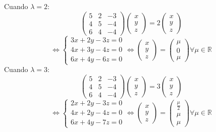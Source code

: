 \documentclass{article}
\begin{document}
Cuando $\lambda = 2$:
$$
\left( \begin{array}{ccc}
    5 & 2 & -3\\
    4 & 5 & -4\\
    6 & 4 & -4
\end{array} \right)
\left( \begin{array}{c}
      x \\
      y \\
      z
\end{array} \right) = 2
\left( \begin{array}{c}
      x \\
      y \\
      z
\end{array} \right)
$$
$$
\Leftrightarrow \left\{ \begin{array}{c}
     3x+2y-3z =0  \\
     4x+3y-4z =0  \\
     6x+4y-6z =0
\end{array} \right.
\Leftrightarrow \left( \begin{array}{c}
      x \\
      y \\
      z
\end{array} \right) =
\left( \begin{array}{c}
      \mu \\
      0 \\
      \mu
\end{array} \right) \forall \mu \in \mathbb{R}
$$
Cuando $\lambda = 3$:
$$
\left( \begin{array}{ccc}
    5 & 2 & -3\\
    4 & 5 & -4\\
    6 & 4 & -4
\end{array} \right)
\left( \begin{array}{c}
      x \\
      y \\
      z
\end{array} \right) = 3
\left( \begin{array}{c}
      x \\
      y \\
      z
\end{array} \right)
$$
$$
\Leftrightarrow \left\{ \begin{array}{c}
     2x+2y-3z =0  \\
     4x+2y-4z =0  \\
     6x+4y-7z =0
\end{array} \right.
\Leftrightarrow \left( \begin{array}{c}
      x \\
      y \\
      z
\end{array} \right) =
\left( \begin{array}{c}
      \frac{\mu}{2} \\
      \mu \\
      \mu
\end{array} \right) \forall \mu \in \mathbb{R}
$$
\end{document}
